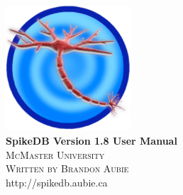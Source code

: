 \documentclass{report}
\begin{document}

\begin{titlepage}
	\begin{center}
		\includegraphics[width=0.35\textwidth]{icon.pdf}\\
		[4.0cm]
		\vspace{0.4cm}
		{ \huge \bfseries SpikeDB Version 1.8 User Manual }\\[0.4cm]
		\vspace{4cm}
		\textsc{\LARGE McMaster University}\\
		[0.5cm]
		\textsc{\Large Written by Brandon Aubie}\\
		\vspace{0.5cm}
		{\large http://spikedb.aubie.ca}

	\end{center}
\end{titlepage}

\tableofcontents 
\end{document}
